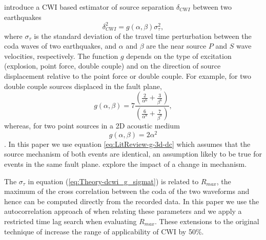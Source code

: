 \documentclass[extra, onecolumn, doublespacing]{gji}
\begin{document}
\citet{dr_Snieder05a} introduce a CWI based estimator of source
separation $\delta_{CWI}$ between two earthquakes
\begin{equation}
\label{eq:Theory-dcwi_g_sigmat}
\delta_{CWI}^2 = g(\alpha,\beta)\sigma_\tau^2,
\end{equation}
where $\sigma_\tau$ is the standard deviation of the travel time
perturbation between the coda waves of two earthquakes, and $\alpha$
and $\beta$ are the near source $P$ and $S$ wave velocities,
respectively. The function $g$ depends on the type of excitation
(explosion, point force, double couple) and on the direction of
source displacement relative to the point force or double couple.
For example, for two double couple sources displaced in the fault
plane,
\begin{equation}
\label{eq:LitReview-g-3d-dc}
g(\alpha,\beta) = 7
\frac{\left(\frac{2}{\alpha^6}+\frac{3}{\beta^6}\right)}{\left(\frac{6}{\alpha^8}+\frac{7}{\beta^8}\right)},
\end{equation}
whereas, for two point sources in a 2D acoustic medium
\begin{equation}
\label{eq:LitReview-g-2d-ps} g(\alpha,\beta) = 2 \alpha^2
\end{equation}
\citep{dr_Snieder05a}. In this paper we use equation
\ref{eq:LitReview-g-3d-dc} which assumes that the source mechanism
of both events are identical, an assumption likely to be true for
events in the same fault plane. \cite{dr_Robinson07c} explore the
impact of a change in mechanism.

The $\sigma_\tau$ in equation (\ref{eq:Theory-dcwi_g_sigmat}) is
related to $R_{max}$, the maximum of the cross correlation between
the coda of the two waveforms and hence can be computed directly
from the recorded data. In this paper we use the autocorrelation
approach of \citet{dr_Robinson11a} when relating these parameters
and we apply a restricted time lag search when evaluating $R_{max}$.
These extensions to the original technique of \citet{dr_Snieder05a}
increase the range of applicability of CWI by 50\%.
\end{document}
